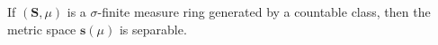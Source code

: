 If $(\mathbf{S}, \mu)$ is a $\sigma$-finite measure ring generated by a countable class, then the metric space $\mathbf{s}(\mu)$ is separable.
